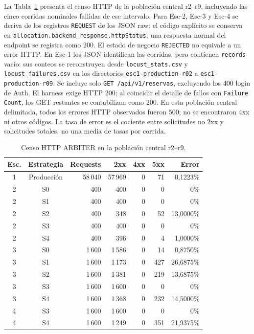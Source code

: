 La Tabla~\ref{tab:arbiter-http} presenta el censo HTTP de la población central
r2--r9, incluyendo las cinco corridas nominales fallidas de ese intervalo.
Para Esc-2, Esc-3 y Esc-4 se deriva de los registros \texttt{REQUEST} de los
JSON raw: el código explícito se conserva en
\texttt{allocation.backend\_response.httpStatus}; una respuesta normal del
endpoint se registra como 200. El estado de negocio \texttt{REJECTED} no
equivale a un error HTTP. En Esc-1 los JSON identifican las corridas, pero
contienen \texttt{records} vacío: sus conteos se reconstruyen desde
\texttt{locust\_stats.csv} y \texttt{locust\_failures.csv} en los directorios
\texttt{esc1-production-r02} a \texttt{esc1-production-r09}. Se incluye solo
\texttt{GET /api/v1/reservas}, excluyendo los 400 login de Auth.
El harness exige HTTP 200; al coincidir el detalle de fallos con
\texttt{Failure Count}, los GET restantes se contabilizan como 200.
En esta población central delimitada, todos los errores HTTP observados fueron
500; no se encontraron 4xx ni otros códigos. La tasa de error es el cociente
entre solicitudes no 2xx y solicitudes totales, no una media de tasas por corrida.

\begin{table}[ht]
  \centering
  \scriptsize
  \caption{Censo HTTP ARBITER en la población central r2--r9.}
  \label{tab:arbiter-http}
  \begin{tabular}{|c|c|r|r|r|r|r|}
    \hline
    \textbf{Esc.} & \textbf{Estrategia} & \textbf{Requests} & \textbf{2xx} & \textbf{4xx} & \textbf{5xx} & \textbf{Error} \\
    \hline
    1 & Producción & 58\,040 & 57\,969 & 0 & 71 & 0,1223\% \\
    \hline
    2 & S0 & 400 & 400 & 0 & 0 & 0\% \\
    2 & S1 & 400 & 400 & 0 & 0 & 0\% \\
    2 & S2 & 400 & 348 & 0 & 52 & 13,0000\% \\
    2 & S3 & 400 & 400 & 0 & 0 & 0\% \\
    2 & S4 & 400 & 396 & 0 & 4 & 1,0000\% \\
    \hline
    3 & S0 & 1\,600 & 1\,586 & 0 & 14 & 0,8750\% \\
    3 & S1 & 1\,600 & 1\,173 & 0 & 427 & 26,6875\% \\
    3 & S2 & 1\,600 & 1\,381 & 0 & 219 & 13,6875\% \\
    3 & S3 & 1\,600 & 1\,600 & 0 & 0 & 0\% \\
    3 & S4 & 1\,600 & 1\,368 & 0 & 232 & 14,5000\% \\
    \hline
    4 & S3 & 1\,600 & 1\,600 & 0 & 0 & 0\% \\
    4 & S4 & 1\,600 & 1\,249 & 0 & 351 & 21,9375\% \\
    \hline
  \end{tabular}
\end{table}

